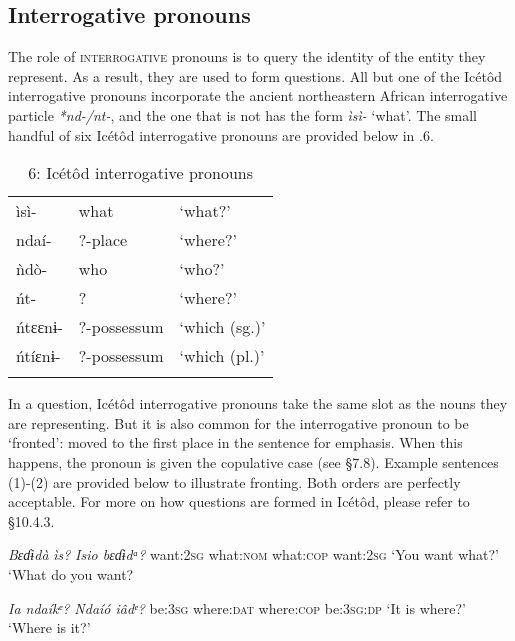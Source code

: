 \subsection{Interrogative pronouns}


The role of \textsc{interrogative} pronouns is to query the identity of the entity they represent. As a result, they are used to form questions. All but one of the Icétôd interrogative pronouns incorporate the ancient northeastern African interrogative particle \textit{*nd-/nt-}, and the one that is not has the form \textit{ìsì-} ‘what’. The small handful of six Icétôd interrogative pronouns are provided below in .6. 


\begin{table}
\caption{6: Icétôd interrogative pronouns}
\label{tab:5}


\begin{tabularx}{\textwidth}{XXX}
\lsptoprule

ìsì- & what & ‘what?’\\
ndaí- & ?-place & ‘where?’\\
ǹdò- & who & ‘who?’\\
ńt- & ? & ‘where?’\\
ńtɛɛnɨ- & ?-possessum & ‘which (sg.)’\\
ńtíɛnɨ- & ?-possessum & ‘which (pl.)’\\
\lspbottomrule
\end{tabularx}
\end{table}
In a question, Icétôd interrogative pronouns take the same slot as the nouns they are representing. But it is also common for the interrogative pronoun to be ‘fronted’: moved to the first place in the sentence for emphasis. When this happens, the pronoun is given the copulative case (see §7.8). Example sentences (1)-(2) are provided below to illustrate fronting. Both orders are perfectly acceptable. For more on how questions are formed in Icétôd, please refer to §10.4.3.




\textit{Bɛɗɨdà}   \textit{ìs}\textit{?}      \textit{Isi}\textit{o     bɛɗɨdᵃ?}
want:\textsc{2sg}   what:\textsc{nom}    what:\textsc{cop}   want:2\textsc{sg}
‘You want what?’      ‘What do you want?




\textit{Ia     ndaíkᵉ?    Ndaíó   iâdᵉ?}
be:\textsc{3sg}   where:\textsc{dat}    where:\textsc{cop}   be:\textsc{3sg:dp}
‘It is where?’      ‘Where is it?’






